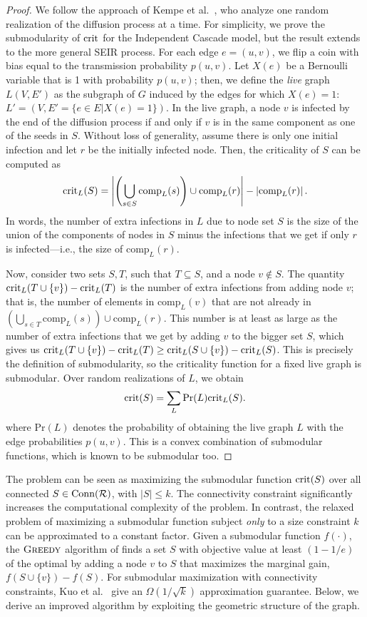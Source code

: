 \begin{proof}
We follow the approach of Kempe et al.\ \cite{kempe:sigkdd03}, who analyze one random realization of the diffusion process at a time. For simplicity, we prove the submodularity of $\text{crit}$ for the Independent Cascade model, but the result extends to the more general SEIR process. For each edge $e=(u,v)$, we flip a coin with bias equal to the transmission probability $p(u,v)$. Let $X(e)$ be a Bernoulli variable that is 1 with probability $p(u,v)$; then, we define the \emph{live} graph $L(V, E')$ as the subgraph of $G$ induced by the edges for which $X(e) = 1$: $L' = (V, E'=\{e \in E | X(e) = 1\})$. In the live graph, a node $v$ is infected by the end of the diffusion process if and only if $v$ is in the same component as one of the seeds in $S$. Without loss of generality, assume there is only one initial infection and let $r$ be the initially infected node. Then, the criticality of $S$ can be computed as
$$
\text{crit}_L(S) = \left|\left(\bigcup_{s \in S} \text{comp}_L(s)\right) \cup \text{comp}_L(r)\right| - \left|\text{comp}_L(r)\right|.
$$
In words, the number of extra infections in $L$ due to node set $S$ is the size of the union of the components of nodes in $S$ minus the infections that we get if only $r$ is infected---i.e., the size of $\text{comp}_L(r)$.

Now, consider two sets $S,T$, such that $T\subseteq S$, and a node $v \not \in S$. The quantity $\text{crit}_L(T \cup \{v\}) - \text{crit}_L(T)$ is the number of extra infections from adding node $v$; that is, the number of elements in $\text{comp}_L(v)$ that are not already in $(\bigcup_{s \in T} \text{comp}_L(s)) \cup \text{comp}_L(r)$. This number is at least as large as the number of extra infections that we get by adding $v$ to the bigger set $S$, which gives us $\text{crit}_L(T \cup \{v\}) - \text{crit}_L(T) \geq \text{crit}_L(S \cup \{v\}) - \text{crit}_L(S)$. This is precisely the definition of submodularity, so the criticality function for a fixed live graph is submodular. Over random realizations of $L$, we obtain
$$
\text{crit}(S) = \sum_{L}\text{Pr}(L) \text{crit}_L(S).
$$
where $\text{Pr}(L)$ denotes the probability of obtaining the live graph $L$ with the edge probabilities $p(u,v)$. This is a convex combination of submodular functions, which is known to be submodular too.%
\end{proof}

The \maxcrit{} problem can be seen as maximizing the submodular function $\text{crit}(S)$ over all connected $S\in\text{Conn}(\mathcal{R})$, with $|S|\leq k$. The connectivity constraint significantly increases the computational complexity of the problem. In contrast, the relaxed problem of maximizing a submodular function subject \emph{only} to a size constraint $k$ can be approximated to a constant factor. Given a submodular function $f(\cdot)$, the $\textsc{Greedy}{}$ algorithm of \cite{nemhauser1978analysis} finds a set $S$ with objective value at least $(1 - 1/e)$ of the optimal by adding a node $v$ to $S$ that maximizes the marginal gain, $f(S\cup\{v\}) - f(S)$.
For submodular maximization with connectivity constraints, Kuo et al.\ \cite{kuo2015maximizing} give an $\Omega(1/\sqrt{k})$ approximation guarantee. Below, we derive an improved algorithm by exploiting the geometric structure of the graph.

